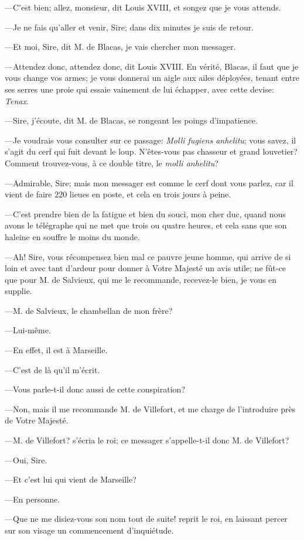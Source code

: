 —C'est bien; allez, monsieur, dit Louis XVIII, et songez que je vous attends.

—Je ne fais qu'aller et venir, Sire; dans dix minutes je suis de retour.

—Et moi, Sire, dit M. de Blacas, je vais chercher mon messager.

—Attendez donc, attendez donc, dit Louis XVIII. En vérité, Blacas, il faut que je vous change vos armes; je vous donnerai un aigle aux ailes déployées, tenant entre ses serres une proie qui essaie vainement de lui échapper, avec cette devise: \textit{Tenax}.

—Sire, j'écoute, dit M. de Blacas, se rongeant les poings d'impatience.


—Je voudrais vous consulter sur ce passage: \textit{Molli fugiens anhelitu}; vous savez, il s'agit du cerf qui fuit devant le loup. N'êtes-vous pas chasseur et grand louvetier? Comment trouvez-vous, à ce double titre, le \textit{molli anhelitu}?

—Admirable, Sire; mais mon messager est comme le cerf dont vous parlez, car il vient de faire 220 lieues en poste, et cela en trois jours à peine.

—C'est prendre bien de la fatigue et bien du souci, mon cher duc, quand nous avons le télégraphe qui ne met que trois ou quatre heures, et cela sans que son haleine en souffre le moins du monde.

—Ah! Sire, vous récompensez bien mal ce pauvre jeune homme, qui arrive de si loin et avec tant d'ardeur pour donner à Votre Majesté un avis utile; ne fût-ce que pour M. de Salvieux, qui me le recommande, recevez-le bien, je vous en supplie.

—M. de Salvieux, le chambellan de mon frère?

—Lui-même.

—En effet, il est à Marseille.

—C'est de là qu'il m'écrit.

—Vous parle-t-il donc aussi de cette conspiration?

—Non, mais il me recommande M. de Villefort, et me charge de l'introduire près de Votre Majesté.

—M. de Villefort? s'écria le roi; ce messager s'appelle-t-il donc M. de Villefort?

—Oui, Sire.

—Et c'est lui qui vient de Marseille?

—En personne.

—Que ne me disiez-vous son nom tout de suite! reprit le roi, en laissant percer sur son visage un commencement d'inquiétude.

